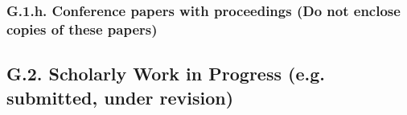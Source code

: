 \documentclass[10pt]{article}
\begin{document}
\subsubsection*{G.1.h. Conference papers with proceedings (Do not enclose copies of these papers)}



\subsection*{G.2. Scholarly Work in Progress (e.g. submitted, under revision)}


\end{document}
